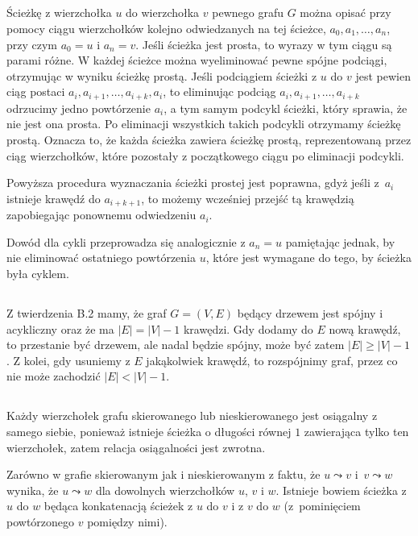 \subsection{} %
Ścieżkę z wierzchołka $u$ do wierzchołka $v$ pewnego grafu $G$ można opisać przy pomocy ciągu wierzchołków kolejno odwiedzanych na tej ścieżce, $a_0,a_1,\dots,a_n$, przy czym $a_0=u$ i $a_n=v$. Jeśli ścieżka jest prosta, to wyrazy w tym ciągu są parami różne. W każdej ścieżce można wyeliminować pewne spójne podciągi, otrzymując w wyniku ścieżkę prostą. Jeśli podciągiem ścieżki z $u$ do $v$ jest pewien ciąg postaci $a_i,a_{i+1},\dots,a_{i+k},a_i$, to eliminując podciąg $a_i,a_{i+1},\dots,a_{i+k}$ odrzucimy jedno powtórzenie $a_i$, a tym samym podcykl ścieżki, który sprawia, że nie jest ona prosta. Po eliminacji wszystkich takich podcykli otrzymamy ścieżkę prostą. Oznacza to, że każda ścieżka zawiera ścieżkę prostą, reprezentowaną przez ciąg wierzchołków, które pozostały z początkowego ciągu po eliminacji podcykli.

Powyższa procedura wyznaczania ścieżki prostej jest poprawna, gdyż jeśli z~$a_i$ istnieje krawędź do $a_{i+k+1}$, to możemy wcześniej przejść tą krawędzią zapobiegając ponownemu odwiedzeniu $a_i$.

Dowód dla cykli przeprowadza się analogicznie z $a_n=u$ pamiętając jednak, by nie eliminować ostatniego powtórzenia $u$, które jest wymagane do tego, by ścieżka była cyklem.

\subsection{} %
Z twierdzenia B.2 mamy, że graf $G=(V,E)$ będący drzewem jest spójny i acykliczny oraz że ma $|E|=|V|-1$ krawędzi. Gdy dodamy do $E$ nową krawędź, to przestanie być drzewem, ale nadal będzie spójny, może być zatem $|E|\ge |V|-1$. Z kolei, gdy usuniemy z $E$ jakąkolwiek krawędź, to rozspójnimy graf, przez co nie może zachodzić $|E|<|V|-1$.

\subsection{} %
Każdy wierzchołek grafu skierowanego lub nieskierowanego jest osiągalny z samego siebie, ponieważ istnieje ścieżka o długości równej $1$ zawierająca tylko ten wierzchołek, zatem relacja osiągalności jest zwrotna.

Zarówno w grafie skierowanym jak i nieskierowanym z faktu, że $u\leadsto v$ i~$v\leadsto w$ wynika, że $u\leadsto w$ dla dowolnych wierzchołków $u$, $v$ i $w$. Istnieje bowiem ścieżka z $u$ do $w$ będąca konkatenacją ścieżek z $u$ do $v$ i z $v$ do $w$ (z~pominięciem powtórzonego $v$ pomiędzy nimi).

